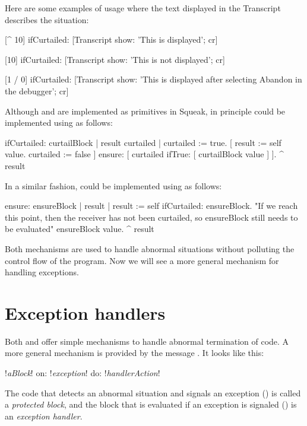 \documentclass[a4paper,10pt,twoside]{book}
\begin{document}
Here are some  examples of  usage where the text displayed in the Transcript describes the situation:

\begin{code}{}
[^ 10] ifCurtailed: [Transcript show: 'This is displayed'; cr] 

[10] ifCurtailed: [Transcript show: 'This is not displayed'; cr] 

[1 / 0] ifCurtailed: [Transcript show: 'This is displayed after selecting Abandon in the debugger'; cr]
\end{code}

Although  and  are implemented as primitives in Squeak, in principle  could be implemented using  as follows:

\begin{code}{}
ifCurtailed: curtailBlock
	| result curtailed |
	curtailed := true.
	[	result := self value.
		curtailed := false
	]	ensure: [ curtailed ifTrue: [ curtailBlock value ] ].
	^ result
\end{code}

In a similar fashion,  could be implemented using  as follows:

\begin{code}{}
ensure: ensureBlock
	| result |
	result := self ifCurtailed: ensureBlock.
	"If we reach this point, then the receiver has not been curtailed,
	so ensureBlock still needs to be evaluated"
	ensureBlock value.
	^ result
\end{code}

Both mechanisms are used to handle abnormal situations without polluting the control flow of the program.
Now we will see a more general mechanism for handling exceptions.

\section{Exception handlers}

Both  and  offer simple mechanisms to handle abnormal termination of code. A more general mechanism is provided by the message . It looks like this:
\begin{code}{}
!\emph{aBlock}! on: !\emph{exception}! do: !\emph{handlerAction}!
\end{code}
\noindent
The code that detects an abnormal situation and signals an exception () is called a \emph{protected block}, and the block that is evaluated if an exception is signaled () is  an \emph{exception handler}.
\end{document}
